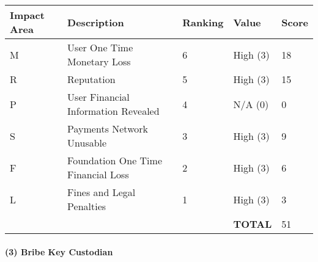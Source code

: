 \documentclass[12pt]{article} %
\begin{document}
{\begin{center}
\begin{tabular}{ | l | l | l | l | l |}
  \hline
  \textbf{Impact Area} & \textbf{Description} & \textbf{Ranking} & \textbf{Value} & \textbf{Score}
  \\ \hline
  M & User One Time Monetary Loss			& 6	& High (3)		& 18
  \\ \hline
  R & Reputation		& 5	& High (3)		& 15
  \\ \hline
  P & User Financial Information Revealed		& 4	& N/A (0)		& 0
  \\ \hline
  S & Payments Network Unusable					& 3	& High (3)		& 9
  \\ \hline
  F & Foundation One Time Financial Loss	& 2	& High (3)		& 6
  \\ \hline
  L & Fines and Legal Penalties						& 1	& High (3)		& 3
  \\ \hline
  & & & \textbf{TOTAL} & 51
  \\ \hline
\end{tabular}
\end{center}
\label{tab:severityTamperKeyGeneration}

\paragraph{(3) Bribe Key Custodian }

}
\end{document}
